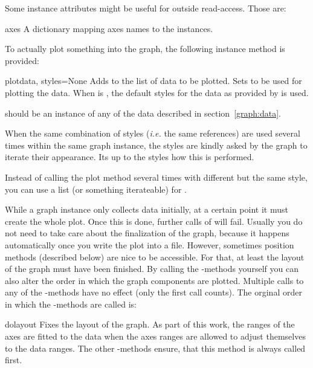 Some instance attributes might be useful for outside read-access.
Those are:

\begin{memberdesc}{axes}
  A dictionary mapping axes names to the  instances.
\end{memberdesc}

To actually plot something into the graph, the following instance
method  is provided:

\begin{methoddesc}{plot}{data, styles=None}
  Adds  to the list of data to be plotted. Sets 
  to be used for plotting the data. When  is ,
  the default styles for the data as provided by  is used.

   should be an instance of any of the data described in
  section~\ref{graph:data}.

  When the same combination of styles (\emph{i.e.} the same
  references) are used several times within the same graph instance,
  the styles are kindly asked by the graph to iterate their
  appearance. Its up to the styles how this is performed.

  Instead of calling the plot method several times with different
   but the same style, you can use a list (or something
  iterateable) for .
\end{methoddesc}

While a graph instance only collects data initially, at a certain
point it must create the whole plot. Once this is done, further calls
of  will fail. Usually you do not need to take care
about the finalization of the graph, because it happens automatically
once you write the plot into a file. However, sometimes position
methods (described below) are nice to be accessible. For that, at
least the layout of the graph must have been finished. By calling the
-methods yourself you can also alter the order in which the
graph components are plotted. Multiple calls to any of the
-methods have no effect (only the first call counts). The
orginal order in which the -methods are called is:

\begin{methoddesc}{dolayout}{}
  Fixes the layout of the graph. As part of this work, the ranges of
  the axes are fitted to the data when the axes ranges are allowed to
  adjust themselves to the data ranges. The other -methods
  ensure, that this method is always called first.
\end{methoddesc}


